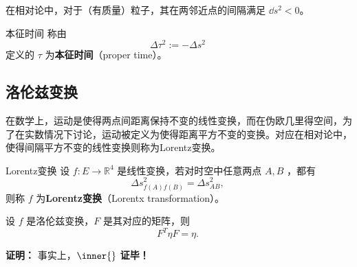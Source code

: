 在相对论中，对于（有质量）粒子，其在两邻近点的间隔满足 $\dd s^2<0$。
\begin{definition}{本征时间}
称由
\begin{equation}
\Delta \tau^2:=-\Delta s^2~
\end{equation}
定义的 $\tau$ 为\textbf{本征时间}（proper time）。
\end{definition}

\subsection{洛伦兹变换}
在数学上，运动是使得两点间距离保持不变的线性变换，而在伪欧几里得空间，为了在实数情况下讨论，运动被定义为使得距离平方不变的变换。对应在相对论中，使得间隔平方不变的线性变换则称为Lorentz变换。
\begin{definition}{Lorentz变换}
设 $f:E\rightarrow\mathbb R^4$ 是线性变换，若对时空中任意两点 $A,B$ ，都有
\begin{equation}
\Delta s^2_{f(A)f(B)}=\Delta s^2_{AB},~
\end{equation}
则称 $f$ 为\textbf{Lorentz变换}（Lorentx transformation）。
\end{definition}

\begin{theorem}{}
设 $f$ 是洛伦兹变换，$F$ 是其对应的矩阵，则
\begin{equation}
F^T\eta F=\eta.~
\end{equation} 
\end{theorem}

\textbf{证明：}
事实上，$\inner{}$
\textbf{证毕！}




















